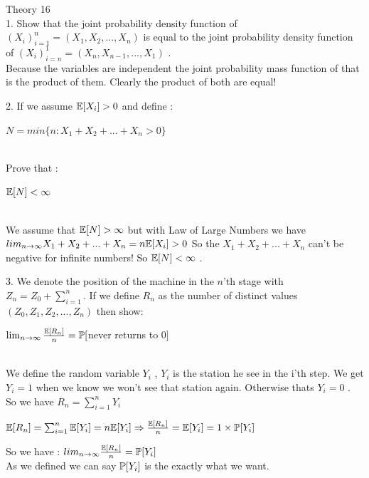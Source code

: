 \documentclass[30pt]{article}
\begin{document}
{\Large \color{blue} Theory 16 } \\
{\color{blue} {\large 1.} Show that the joint probability density function of $(X_i)_{i=1}^{n} = (X_1,X_2,...,X_n) $ is equal to the joint probability density function of $(X_i)_{i=n}^{1} = (X_n,X_{n-1},...,X_1) $ . } \\ \newline
Because the variables are independent the joint probability mass function of that is the product of them. Clearly the product of both are equal!

{\color{blue} {\large 2.} If we assume $\Bbb{E}[X_i] > 0 $ and define : \\ 
\begin{center}
    $N = min \{n : X_1 + X_2 + ... + X_n > 0 \} $
\end{center} \\ Prove that : \\ 
\begin{center}
    $\Bbb{E}[N] < \infty $
\end{center} } \\ \newline 
We assume that $\Bbb{E}[N] > \infty $ but with Law of Large Numbers we have $lim_{n \to \infty} X_1 + X_2 + ... + X_n = n\Bbb{E}[X_i] > 0 $ So the $ X_1 + X_2 + ... + X_n $ can't be negative for infinite numbers! So  $\Bbb{E}[N] < \infty $ . \\


{\color{blue} {\large 3.} We denote the position of the machine in the $n$'th stage with $Z_n = Z_0 + \sum_{i=1}^{n} $. If we define $R_n$ as the number of distinct values $(Z_0,Z_1,Z_2,...,Z_n)$ then show:\\
\begin{center}
    $\lim_{n\to\infty} \frac{\Bbb{E}[R_n]}{n} = \Bbb{P}[$never returns to 0$]$
\end{center}
} \\ \newline 
We define the random variable $Y_i$ , $Y_i$ is the station he see in the i'th step. We get $Y_i = 1$ when we know we won't see that station again. Otherwise thats $Y_i = 0$ . So we have $R_n = \sum_{i=1}^{n} Y_i $ 
\begin{center}
    $\Bbb{E}[R_n] = \sum_{i=1}^{n} \Bbb{E}[Y_i] = n \Bbb{E}[Y_i] \Rightarrow \frac{\Bbb{E}[R_n]}{n} = \Bbb{E}[Y_i] = 1 \times \Bbb{P}[Y_i] $
\end{center}
So we have : $lim_{n \to \infty} \frac{\Bbb{E}[R_n]}{n} = \Bbb{P}[Y_i] $ \\
As we defined we can say $\Bbb{P}[Y_i]$ is the exactly what we want. \\
\end{document}
